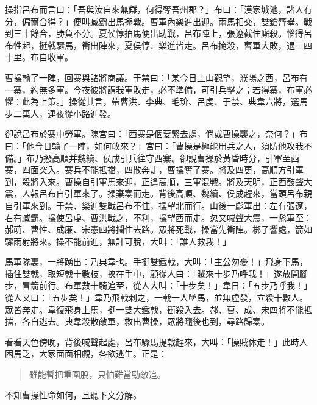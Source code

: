 操指呂布而言曰：「吾與汝自來無讎，何得奪吾州郡？」布曰：「漢家城池，諸人有分，偏爾合得？」便叫臧霸出馬搦戰。曹軍內樂進出迎。兩馬相交，雙鎗齊舉。戰到三十餘合，勝負不分。夏侯惇拍馬便出助戰，呂布陣上，張遼截住廝殺。惱得呂布性起，挺戟驟馬，衝出陣來，夏侯惇、樂進皆走。呂布掩殺，曹軍大敗，退三四十里。布自收軍。

曹操輸了一陣，回寨與諸將商議。于禁曰：「某今日上山觀望，濮陽之西，呂布有一寨，約無多軍。今夜彼將謂我軍敗走，必不準備，可引兵擊之；若得寨，布軍必懼：此為上策。」操從其言，帶曹洪、李典、毛玠、呂虔、于禁、典韋六將，選馬步二萬人，連夜從小路進發。

卻說呂布於寨中勞軍。陳宮曰：「西寨是個要緊去處，倘或曹操襲之，奈何？」布曰：「他今日輸了一陣，如何敢來？」宮曰：「曹操是極能用兵之人，須防他攻我不備。」布乃撥高順并魏續、侯成引兵往守西寨。卻說曹操於黃昏時分，引軍至西寨，四面突入。寨兵不能抵擋，四散奔走，曹操奪了寨。將及四更，高順方引軍到，殺將入來。曹操自引軍馬來迎，正逢高順，三軍混戰。將及天明，正西鼓聲大震，人報呂布自引軍來了。操棄寨而走。背後高順、魏續、侯成趕來，當頭呂布親自引軍來到。于禁、樂進雙戰呂布不住，操望北而行。山後一彪軍出：左有張遼，右有臧霸。操使呂虔、曹洪戰之，不利，操望西而走。忽又喊聲大震，一彪軍至：郝萌、曹性、成廉、宋憲四將攔住去路。眾將死戰，操當先衝陣。梆子響處，箭如驟雨射將來。操不能前進，無計可脫，大叫：「誰人救我！」

馬軍隊裏，一將踴出：乃典韋也。手挺雙鐵戟，大叫：「主公勿憂！」飛身下馬，插住雙戟，取短戟十數枝，挾在手中，顧從人曰：「賊來十步乃呼我！」遂放開腳步，冒箭前行。布軍數十騎追至，從人大叫：「十步矣！」韋日：「五步乃呼我！」從人又曰：「五步矣！」韋乃飛戟刺之，一戟一人墜馬，並無虛發，立殺十數人。眾皆奔走。韋復飛身上馬，挺一雙大鐵戟，衝殺入去。郝、曹、成、宋四將不能抵擋，各自逃去。典韋殺散敵軍，救出曹操，眾將隨後也到，尋路歸寨。

看看天色傍晚，背後喊聲起處，呂布驟馬提戟趕來，大叫：「操賊休走！」此時人困馬乏，大家面面相覷，各欲逃生。正是：

\begin{quote}
雖能暫把重圍脫，只怕難當勁敵追。
\end{quote}

不知曹操性命如何，且聽下文分解。
